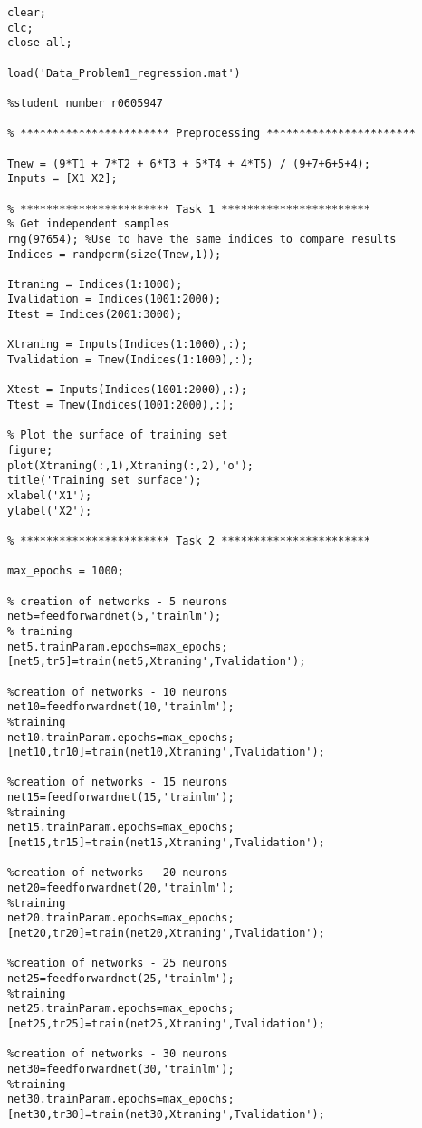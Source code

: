 \begin{lstlisting}[frame=single]
clear;
clc;
close all;

load('Data_Problem1_regression.mat')

%student number r0605947

% *********************** Preprocessing ***********************

Tnew = (9*T1 + 7*T2 + 6*T3 + 5*T4 + 4*T5) / (9+7+6+5+4);
Inputs = [X1 X2];

% *********************** Task 1 ***********************
% Get independent samples
rng(97654); %Use to have the same indices to compare results 
Indices = randperm(size(Tnew,1)); 

Itraning = Indices(1:1000);
Ivalidation = Indices(1001:2000);
Itest = Indices(2001:3000);

Xtraning = Inputs(Indices(1:1000),:);
Tvalidation = Tnew(Indices(1:1000),:);

Xtest = Inputs(Indices(1001:2000),:);
Ttest = Tnew(Indices(1001:2000),:);

% Plot the surface of training set
figure;
plot(Xtraning(:,1),Xtraning(:,2),'o');
title('Training set surface');
xlabel('X1');
ylabel('X2');

% *********************** Task 2 ***********************

max_epochs = 1000;

% creation of networks - 5 neurons
net5=feedforwardnet(5,'trainlm');
% training
net5.trainParam.epochs=max_epochs;
[net5,tr5]=train(net5,Xtraning',Tvalidation');

%creation of networks - 10 neurons
net10=feedforwardnet(10,'trainlm');
%training
net10.trainParam.epochs=max_epochs;
[net10,tr10]=train(net10,Xtraning',Tvalidation');

%creation of networks - 15 neurons
net15=feedforwardnet(15,'trainlm');
%training
net15.trainParam.epochs=max_epochs;
[net15,tr15]=train(net15,Xtraning',Tvalidation');

%creation of networks - 20 neurons
net20=feedforwardnet(20,'trainlm');
%training
net20.trainParam.epochs=max_epochs;
[net20,tr20]=train(net20,Xtraning',Tvalidation');

%creation of networks - 25 neurons
net25=feedforwardnet(25,'trainlm');
%training
net25.trainParam.epochs=max_epochs;
[net25,tr25]=train(net25,Xtraning',Tvalidation');

%creation of networks - 30 neurons
net30=feedforwardnet(30,'trainlm');
%training
net30.trainParam.epochs=max_epochs;
[net30,tr30]=train(net30,Xtraning',Tvalidation');


\end{lstlisting}
